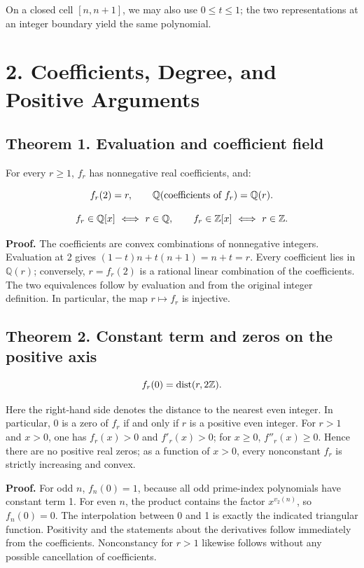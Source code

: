 \documentclass[11pt,a4paper]{article}
\newcommand{\fitmath}[1]{\begingroup\setbox0=\hbox{$\displaystyle #1$}\ifdim\wd0>\linewidth\resizebox{\linewidth}{!}{\box0}\else\box0\fi\endgroup}
\begin{document}
On a closed cell $[n,n+1]$, we may also use $0\leq t\leq1$; the two representations at an integer boundary yield the same polynomial.


\section*{2. Coefficients, Degree, and Positive Arguments}

\subsection*{Theorem 1. Evaluation and coefficient field}

For every $r\geq1$, $f_r$ has nonnegative real coefficients, and:


\[
\fitmath{f_r(2)=r,\qquad \mathbb Q(\text{coefficients of }f_r)=\mathbb Q(r).}
\]


\[
\fitmath{f_r\in\mathbb Q[x]\ \Longleftrightarrow\ r\in\mathbb Q,\qquad f_r\in\mathbb Z[x]\ \Longleftrightarrow\ r\in\mathbb Z.}
\]


\textbf{Proof.} The coefficients are convex combinations of nonnegative integers. Evaluation at 2 gives $(1-t)n+t(n+1)=n+t=r$. Every coefficient lies in $\mathbb Q(r)$; conversely, $r=f_r(2)$ is a rational linear combination of the coefficients. The two equivalences follow by evaluation and from the original integer definition. In particular, the map $r\mapsto f_r$ is injective.


\subsection*{Theorem 2. Constant term and zeros on the positive axis}

\[
\fitmath{f_r(0)=\operatorname{dist}(r,2\mathbb Z).}
\]


Here the right-hand side denotes the distance to the nearest even integer. In particular, 0 is a zero of $f_r$ if and only if $r$ is a positive even integer. For $r>1$ and $x>0$, one has $f_r(x)>0$ and $f'_r(x)>0$; for $x\geq0$, $f''_r(x)\geq0$. Hence there are no positive real zeros; as a function of $x>0$, every nonconstant $f_r$ is strictly increasing and convex.


\textbf{Proof.} For odd $n$, $f_n(0)=1$, because all odd prime-index polynomials have constant term 1. For even $n$, the product contains the factor $x^{v_2(n)}$, so $f_n(0)=0$. The interpolation between 0 and 1 is exactly the indicated triangular function. Positivity and the statements about the derivatives follow immediately from the coefficients. Nonconstancy for $r>1$ likewise follows without any possible cancellation of coefficients.
\end{document}
